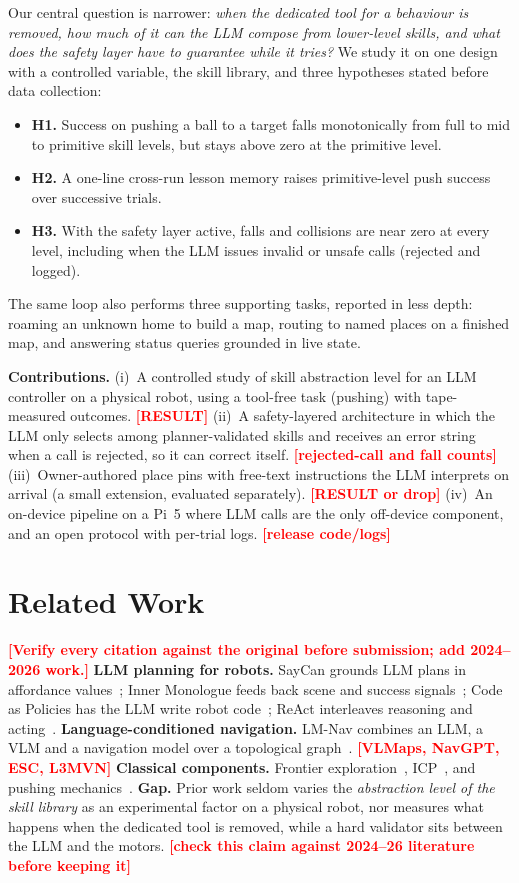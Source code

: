 \documentclass[conference]{IEEEtran}
\newcommand{\todo}[1]{\textcolor{red}{\textbf{[#1]}}}
\begin{document}
Our central question is narrower: \emph{when the dedicated tool for a behaviour is removed, how much of it can the LLM compose from lower-level skills, and what does the safety layer have to guarantee while it tries?}
We study it on one design with a controlled variable, the skill library, and three hypotheses stated before data collection:
\begin{itemize}
\item \textbf{H1.} Success on pushing a ball to a target falls monotonically from full to mid to primitive skill levels, but stays above zero at the primitive level.
\item \textbf{H2.} A one-line cross-run lesson memory raises primitive-level push success over successive trials.
\item \textbf{H3.} With the safety layer active, falls and collisions are near zero at every level, including when the LLM issues invalid or unsafe calls (rejected and logged).
\end{itemize}
The same loop also performs three supporting tasks, reported in less depth: roaming an unknown home to build a map, routing to named places on a finished map, and answering status queries grounded in live state.

\noindent\textbf{Contributions.}
(i)~A controlled study of skill abstraction level for an LLM controller on a physical robot, using a tool-free task (pushing) with tape-measured outcomes. \todo{RESULT}
(ii)~A safety-layered architecture in which the LLM only selects among planner-validated skills and receives an error string when a call is rejected, so it can correct itself. \todo{rejected-call and fall counts}
(iii)~Owner-authored place pins with free-text instructions the LLM interprets on arrival (a small extension, evaluated separately). \todo{RESULT or drop}
(iv)~An on-device pipeline on a Pi~5 where LLM calls are the only off-device component, and an open protocol with per-trial logs. \todo{release code/logs}

\section{Related Work}
\todo{Verify every citation against the original before submission; add 2024--2026 work.}
\textbf{LLM planning for robots.} SayCan grounds LLM plans in affordance values~\cite{saycan}; Inner Monologue feeds back scene and success signals~\cite{innermonologue};
Code as Policies has the LLM write robot code~\cite{codeaspolicies}; ReAct interleaves reasoning and acting~\cite{react}.
\textbf{Language-conditioned navigation.} LM-Nav combines an LLM, a VLM and a navigation model over a topological graph~\cite{lmnav}. \todo{VLMaps, NavGPT, ESC, L3MVN}
\textbf{Classical components.} Frontier exploration~\cite{yamauchi}, ICP~\cite{icp}, and pushing mechanics~\cite{mason}.
\textbf{Gap.} Prior work seldom varies the \emph{abstraction level of the skill library} as an experimental factor on a physical robot, nor measures what happens when the dedicated tool is removed, while a hard validator sits between the LLM and the motors. \todo{check this claim against 2024--26 literature before keeping it}
\end{document}
